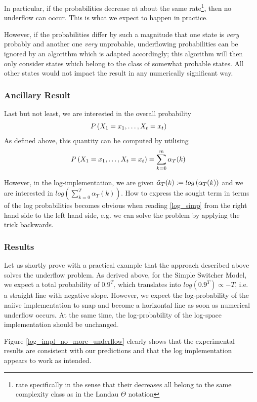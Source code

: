 In particular, if the probabilities decrease at about the same rate\footnote{rate specifically in the sense that their decreases all belong to the same complexity class as in the Landau $\Theta$ notation}, then no underflow can occur. This is what we expect to happen in practice. 

However, if the probabilities differ by such a magnitude that one state is \textit{very} probably and another one \textit{very} unprobable, underflowing probabilities can be ignored by an algorithm which is adapted accordingly; this algorithm will then only consider states which belong to the class of somewhat probable states. All other states would not impact the result in any numerically significant way. 


\subsubsection*{Ancillary Result}
Last but not least, we are interested in the overall probability
\[
	P \left(X_1 = x_1, \dots, X_t = x_t\right)
\] 
As defined above, this quantity can be computed by utilising
\[
P \left(X_1 = x_1, \dots, X_t = x_t\right) = \sum\limits_{k=0}^m \alpha_T(k)
\]

However, in the log-implementation, we are given $\tilde{\alpha}_{T}(k) := log\left(\alpha_T(k)\right)$ and we are interested in $log\left(\sum\limits_{k=0}^T \alpha_T(k) \right)$. How to express the sought term in terms of the log probabilities becomes obvious when reading \ref{log_simp} from the right hand side to the left hand side, e.g. we can solve the problem by applying the trick backwards. 


\subsubsection{Results}
Let us shortly prove with a practical example that the approach described above solves the underflow problem. 
As derived above, for the Simple Switcher Model, we expect a total probability of $0.9^T$, which translates into $log\left(0.9^T\right) \propto -T$, i.e. a straight line with negative slope. However, we expect the log-probability of the naiive implementation to snap and become a horizontal line as soon as numerical underflow occurs. At the same time, the log-probability of the log-space implementation should be unchanged. 

Figure \ref{log_impl_no_more_underflow} clearly shows that the experimental results are consistent with our predictions and that the log implementation appears to work as intended.

